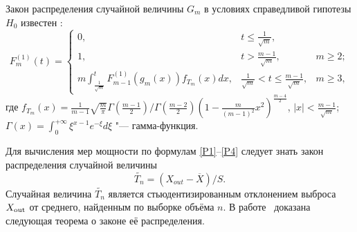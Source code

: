 Закон распределения случайной величины  \begin{math}G_m\end{math} в условиях справедливой гипотезы
 \begin{math}H_0\end{math} известен \cite{Zha, Bar}:
\begin{equation}\label{FH0}
F_{m}^{(1)}(t)=
\left\{
\begin{array}{ccl}
0, & t\le\frac{1}{\sqrt{m}}, & \\
1, & t>\frac{m-1}{\sqrt{m}}, & m\ge 2;\\
\displaystyle m\int_{\frac{1}{\sqrt{m}}}^{t}  F_{m-1}^{(1)}\left(g_m(x)\right)f_{T_m}(x)dx, &
\frac{1}{\sqrt{m}}<t\leqslant\frac{m-1}{\sqrt{m}}, & m\ge 3,
\end{array}
\right.
\end{equation}
где
$f_{T_m}(x)=\frac{1}{m-1}\sqrt{\frac{m}{\pi}}\Gamma\left(\frac{m-1}{2}\right)/\Gamma\left(\frac{m-2}{2}\right)
\left(1-\frac{m}{(m-1)^2}x^2\right)^{\frac{m-4}{2}}$, $|x|<\frac{m-1}{\sqrt{m}}$;
$\Gamma(x) = \displaystyle \int _0^{+\infty} \xi^{x-1} e^{-\xi} d\xi$ "--- гамма-функция.


Для  вычисления мер мощности по формулам \eqref{P1}--\eqref{P4} следует знать закон распределения
случайной величины
\begin{equation}\label{Tn}
\tilde{T_{n}}=(X_{out}-\overline{X})/S.
\end{equation}
Случайная величина  $\tilde{T_{n}}$ является стьюдентизированным отклонением выброса
$X_{\rm out}$ от среднего, найденным по выборке объёма $n$. В работе~\cite{Shir} доказана следующая теорема о законе её распределения.

